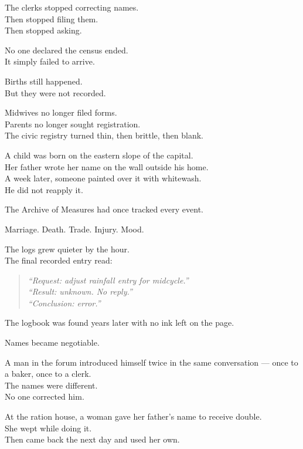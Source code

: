 \documentclass[12pt]{article}
\begin{document}
The clerks stopped correcting names.\\
Then stopped filing them.\\
Then stopped asking.

No one declared the census ended.\\
It simply failed to arrive.

\vspace{1em}

Births still happened.\\
But they were not recorded.

Midwives no longer filed forms.\\
Parents no longer sought registration.\\
The civic registry turned thin, then brittle, then blank.

A child was born on the eastern slope of the capital.\\
Her father wrote her name on the wall outside his home.\\
A week later, someone painted over it with whitewash.\\
He did not reapply it.

\vspace{1em}

The Archive of Measures had once tracked every event.

Marriage. Death. Trade. Injury. Mood.

The logs grew quieter by the hour.\\
The final recorded entry read:

\begin{quote}
\textit{“Request: adjust rainfall entry for midcycle.”}\\
\textit{“Result: unknown. No reply.”}\\
\textit{“Conclusion: error.”}
\end{quote}

The logbook was found years later with no ink left on the page.

\vspace{1em}

Names became negotiable.

A man in the forum introduced himself twice in the same conversation — once to a baker, once to a clerk.\\
The names were different.\\
No one corrected him.

At the ration house, a woman gave her father’s name to receive double.\\
She wept while doing it.\\
Then came back the next day and used her own.
\end{document}

